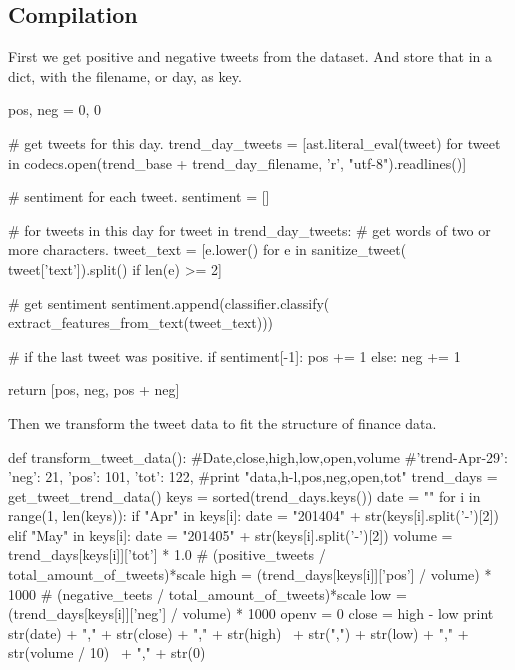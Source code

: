 \subsection{Compilation}

First we get positive and negative tweets from the dataset. And store that in a
dict, with the filename, or day, as key. 
\begin{python}
pos, neg = 0, 0

# get tweets for this day.
trend_day_tweets = [ast.literal_eval(tweet) for tweet in
    codecs.open(trend_base + trend_day_filename, 
                'r',
                "utf-8").readlines()]

# sentiment for each tweet.
sentiment = []

# for tweets in this day
for tweet in trend_day_tweets:
    # get words of two or more characters.
    tweet_text = [e.lower() for e in sanitize_tweet(
          tweet['text']).split() if len(e) >= 2]

	# get sentiment
    sentiment.append(classifier.classify(
        extract_features_from_text(tweet_text)))

    # if the last tweet was positive.
    if sentiment[-1]:
        pos += 1
    else:
        neg += 1

return [pos, neg, pos + neg]
\end{python}

Then we transform the tweet data to fit the structure of finance data. 
\begin{python}
def transform_tweet_data():
    #Date,close,high,low,open,volume
    #'trend-Apr-29': {'neg': 21, 'pos': 101, 'tot': 122},
    #print "data,h-l,pos,neg,open,tot"
    trend_days = get_tweet_trend_data()
    keys = sorted(trend_days.keys())
    date = ""
    for i in range(1, len(keys)):
        if "Apr" in keys[i]:
            date = "201404" + str(keys[i].split('-')[2])
        elif "May" in keys[i]:
            date = "201405" + str(keys[i].split('-')[2])
        volume = trend_days[keys[i]]['tot'] * 1.0
        # (positive_tweets / total_amount_of_tweets)*scale
        high = (trend_days[keys[i]]['pos'] / volume) * 1000
        # (negative_teets / total_amount_of_tweets)*scale
        low = (trend_days[keys[i]]['neg'] / volume) * 1000
        openv = 0
        close = high - low
        print str(date) + "," + str(close) + "," + str(high) \
              + str(",") + str(low) + "," + str(volume / 10) \
              + "," + str(0)
\end{python}

